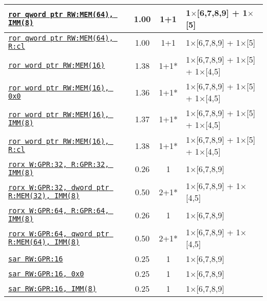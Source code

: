 \documentclass[a4paper,english,fontsize=9]{scrartcl}
\begin{document}
\begin{longtable}{p{}ccL{.25\textwidth}}
  \midrule
  \texttt{\href{https://felixcloutier.com/x86/RCL:RCR:ROL:ROR.html}{ror qword ptr RW:MEM(64), IMM(8)}} & 1.00 & 1+1 & 1\(\times\)[6,7,8,9] + 1\(\times\)[5] \\
  \midrule
  \texttt{\href{https://felixcloutier.com/x86/RCL:RCR:ROL:ROR.html}{ror qword ptr RW:MEM(64), R:cl}} & 1.00 & 1+1 & 1\(\times\)[6,7,8,9] + 1\(\times\)[5] \\
  \midrule
  \texttt{\href{https://felixcloutier.com/x86/RCL:RCR:ROL:ROR.html}{ror word ptr RW:MEM(16)}} & 1.38 & 1+1* & 1\(\times\)[6,7,8,9] + 1\(\times\)[5] + 1\(\times\)[4,5] \\
  \midrule
  \texttt{\href{https://felixcloutier.com/x86/RCL:RCR:ROL:ROR.html}{ror word ptr RW:MEM(16), 0x0}} & 1.36 & 1+1* & 1\(\times\)[6,7,8,9] + 1\(\times\)[5] + 1\(\times\)[4,5] \\
  \midrule
  \texttt{\href{https://felixcloutier.com/x86/RCL:RCR:ROL:ROR.html}{ror word ptr RW:MEM(16), IMM(8)}} & 1.37 & 1+1* & 1\(\times\)[6,7,8,9] + 1\(\times\)[5] + 1\(\times\)[4,5] \\
  \midrule
  \texttt{\href{https://felixcloutier.com/x86/RCL:RCR:ROL:ROR.html}{ror word ptr RW:MEM(16), R:cl}} & 1.38 & 1+1* & 1\(\times\)[6,7,8,9] + 1\(\times\)[5] + 1\(\times\)[4,5] \\
  \midrule
  \texttt{\href{https://felixcloutier.com/x86/RORX.html}{rorx W:GPR:32, R:GPR:32, IMM(8)}} & 0.26 & 1 & 1\(\times\)[6,7,8,9] \\
  \midrule
  \texttt{\href{https://felixcloutier.com/x86/RORX.html}{rorx W:GPR:32, dword ptr R:MEM(32), IMM(8)}} & 0.50 & 2+1* & 1\(\times\)[6,7,8,9] + 1\(\times\)[4,5] \\
  \midrule
  \texttt{\href{https://felixcloutier.com/x86/RORX.html}{rorx W:GPR:64, R:GPR:64, IMM(8)}} & 0.26 & 1 & 1\(\times\)[6,7,8,9] \\
  \midrule
  \texttt{\href{https://felixcloutier.com/x86/RORX.html}{rorx W:GPR:64, qword ptr R:MEM(64), IMM(8)}} & 0.50 & 2+1* & 1\(\times\)[6,7,8,9] + 1\(\times\)[4,5] \\
  \midrule
  \texttt{\href{https://felixcloutier.com/x86/SAL:SAR:SHL:SHR.html}{sar RW:GPR:16}} & 0.25 & 1 & 1\(\times\)[6,7,8,9] \\
  \midrule
  \texttt{\href{https://felixcloutier.com/x86/SAL:SAR:SHL:SHR.html}{sar RW:GPR:16, 0x0}} & 0.25 & 1 & 1\(\times\)[6,7,8,9] \\
  \midrule
  \texttt{\href{https://felixcloutier.com/x86/SAL:SAR:SHL:SHR.html}{sar RW:GPR:16, IMM(8)}} & 0.25 & 1 & 1\(\times\)[6,7,8,9] \\

\end{longtable}
\end{document}
